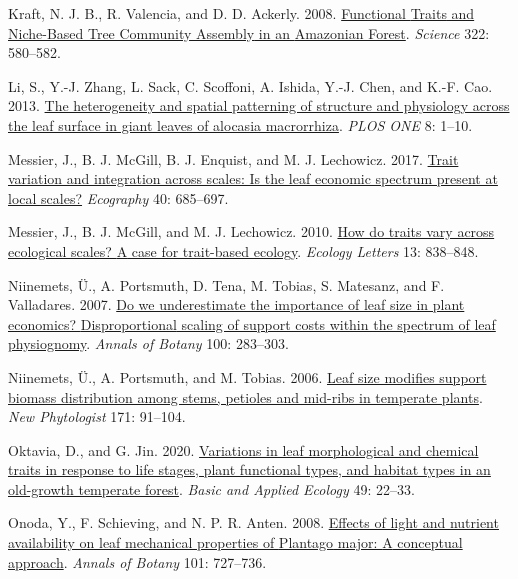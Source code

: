 \documentclass[
  12pt,
  a4paper,
,tablecaptionabove
]{scrartcl}
\newlength{\cslhangindent}
\newenvironment{CSLReferences}[2] %
 {%
  \setlength{\parindent}{0pt}
  \ifodd #1 \everypar{\setlength{\hangindent}{\cslhangindent}}\ignorespaces\fi
  \ifnum #2 > 0
  \setlength{\parskip}{#2\baselineskip}
  \fi
 }%
 {}
\begin{document}
\begin{CSLReferences}{1}{0}
\leavevmode{}%
Kraft, N. J. B., R. Valencia, and D. D. Ackerly. 2008.
\href{https://doi.org/10.1126/science.1160662}{Functional {Traits} and
{Niche-Based Tree Community Assembly} in an {Amazonian Forest}}.
\emph{Science} 322: 580--582.

\leavevmode{}%
Li, S., Y.-J. Zhang, L. Sack, C. Scoffoni, A. Ishida, Y.-J. Chen, and
K.-F. Cao. 2013. \href{https://doi.org/10.1371/journal.pone.0066016}{The
heterogeneity and spatial patterning of structure and physiology across
the leaf surface in giant leaves of alocasia macrorrhiza}. \emph{PLOS
ONE} 8: 1--10.

\leavevmode{}%
Messier, J., B. J. McGill, B. J. Enquist, and M. J. Lechowicz. 2017.
\href{https://doi.org/10.1111/ecog.02006}{Trait variation and
integration across scales: Is the leaf economic spectrum present at
local scales?} \emph{Ecography} 40: 685--697.

\leavevmode{}%
Messier, J., B. J. McGill, and M. J. Lechowicz. 2010.
\href{https://doi.org/10.1111/j.1461-0248.2010.01476.x}{How do traits
vary across ecological scales? {A} case for trait-based ecology}.
\emph{Ecology Letters} 13: 838--848.

\leavevmode{}%
Niinemets, Ü., A. Portsmuth, D. Tena, M. Tobias, S. Matesanz, and F.
Valladares. 2007. \href{https://doi.org/10.1093/aob/mcm107}{Do we
underestimate the importance of leaf size in plant economics?
{Disproportional} scaling of support costs within the spectrum of leaf
physiognomy}. \emph{Annals of Botany} 100: 283--303.

\leavevmode{}%
Niinemets, Ü., A. Portsmuth, and M. Tobias. 2006.
\href{https://doi.org/10.1111/j.1469-8137.2006.01741.x}{Leaf size
modifies support biomass distribution among stems, petioles and mid-ribs
in temperate plants}. \emph{New Phytologist} 171: 91--104.

\leavevmode{}%
Oktavia, D., and G. Jin. 2020.
\href{https://doi.org/10.1016/j.baae.2020.09.010}{Variations in leaf
morphological and chemical traits in response to life stages, plant
functional types, and habitat types in an old-growth temperate forest}.
\emph{Basic and Applied Ecology} 49: 22--33.

\leavevmode{}%
Onoda, Y., F. Schieving, and N. P. R. Anten. 2008.
\href{https://doi.org/10.1093/aob/mcn013}{Effects of light and nutrient
availability on leaf mechanical properties of {Plantago} major: {A}
conceptual approach}. \emph{Annals of Botany} 101: 727--736.


\end{CSLReferences}
\end{document}
